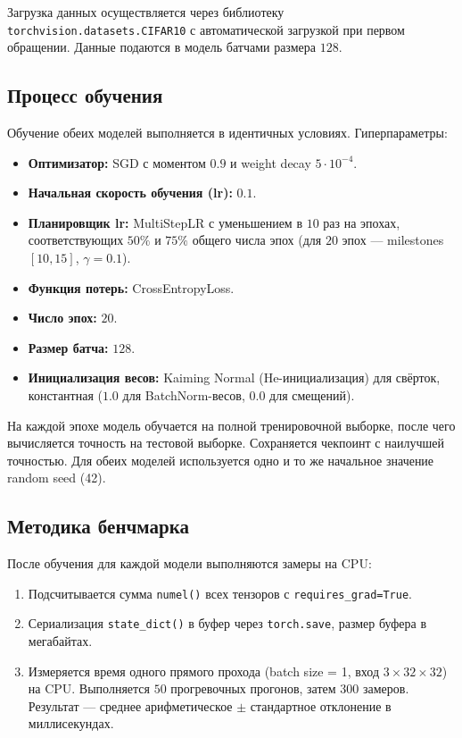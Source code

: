 Загрузка данных осуществляется через библиотеку \\
\texttt{torchvision.datasets.CIFAR10} с автоматической загрузкой при первом обращении. Данные подаются в модель батчами размера $128$.

\subsection{Процесс обучения}

Обучение обеих моделей выполняется в идентичных условиях. Гиперпараметры:

\begin{itemize}
    \item \textbf{Оптимизатор:} SGD с моментом $0.9$ и weight decay $5 \cdot 10^{-4}$.
    \item \textbf{Начальная скорость обучения (lr):} $0.1$.
    \item \textbf{Планировщик lr:} MultiStepLR с уменьшением в $10$ раз на эпохах, соответствующих $50\%$ и $75\%$ общего числа эпох (для $20$ эпох — milestones $[10, 15]$, $\gamma = 0.1$).
    \item \textbf{Функция потерь:} CrossEntropyLoss.
    \item \textbf{Число эпох:} $20$.
    \item \textbf{Размер батча:} $128$.
    \item \textbf{Инициализация весов:} Kaiming Normal (He-инициализация) для свёрток, константная ($1.0$ для BatchNorm-весов, $0.0$ для смещений).
\end{itemize}

На каждой эпохе модель обучается на полной тренировочной выборке, после чего вычисляется точность на тестовой выборке. Сохраняется чекпоинт с наилучшей точностью. Для обеих моделей используется одно и то же начальное значение random seed (42).

\subsection{Методика бенчмарка}

После обучения для каждой модели выполняются замеры на CPU:

\begin{enumerate}
    \item Подсчитывается сумма \texttt{numel()} всех тензоров с \texttt{requires\_grad=True}.
    \item Сериализация \texttt{state\_dict()} в буфер через \texttt{torch.save}, размер буфера в мегабайтах.
    \item Измеряется время одного прямого прохода (batch size = 1, вход $3\times32\times32$) на CPU. Выполняется $50$ прогревочных прогонов, затем $300$ замеров. Результат — среднее арифметическое $\pm$ стандартное отклонение в миллисекундах.
\end{enumerate}

